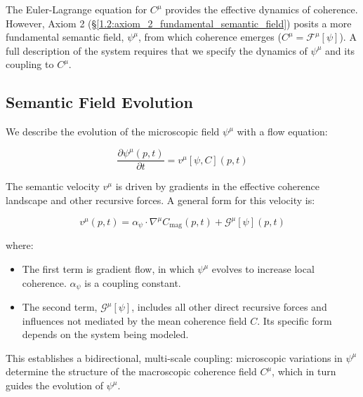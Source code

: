 The Euler-Lagrange equation for \(C^\mu\) provides the effective dynamics of coherence. However, Axiom 2 (\S\ref{1.2:axiom_2_fundamental_semantic_field}) posits a more fundamental semantic field, \(\psi^\mu\), from which coherence emerges (\(C^\mu = \mathcal{F}^\mu[\psi]\)). A full description of the system requires that we specify the dynamics of \(\psi^\mu\) and its coupling to \(C^\mu\).


\subsection{Semantic Field Evolution}
\label{6.5.1:semantic_field_evolution}

We describe the evolution of the microscopic field \(\psi^\mu\) with a flow equation:

\begin{equation}
\frac{\partial \psi^\mu(p, t)}{\partial t} = v^\mu[\psi, C](p, t)
\end{equation}

The semantic velocity \(v^\mu\) is driven by gradients in the effective coherence landscape and other recursive forces. A general form for this velocity is:

\begin{equation}
v^\mu(p, t) = \alpha_{\psi} \cdot \nabla^\mu C_{\mathrm{mag}}(p, t) + \mathcal{G}^\mu[\psi](p, t)
\end{equation}

where:

\begin{itemize}

    \item The first term is gradient flow, in which \(\psi^\mu\) evolves to increase local coherence. \(\alpha_{\psi}\) is a coupling constant.
    
    \item The second term, \(\mathcal{G}^\mu[\psi]\), includes all other direct recursive forces and influences not mediated by the mean coherence field \(C\). Its specific form depends on the system being modeled.

\end{itemize}

This establishes a bidirectional, multi-scale coupling: microscopic variations in \(\psi^\mu\) determine the structure of the macroscopic coherence field \(C^\mu\), which in turn guides the evolution of \(\psi^\mu\).


